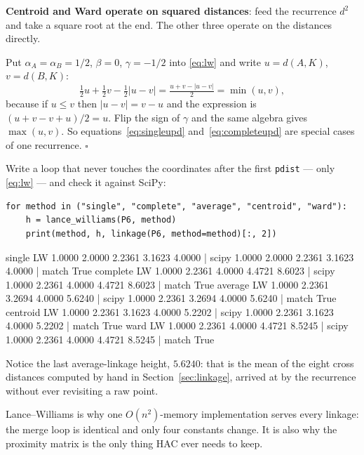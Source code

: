 \documentclass[11pt]{article}
\begin{document}
\textbf{Centroid and Ward operate on squared distances}: feed the recurrence
$d^2$ and take a square root at the end. The other three operate on the
distances directly.

\begin{worked}
Put $\alpha_A = \alpha_B = 1/2$, $\beta = 0$, $\gamma = -1/2$ into
\eqref{eq:lw} and write $u = d(A,K)$, $v = d(B,K)$:
\[
  \tfrac12 u + \tfrac12 v - \tfrac12|u-v| = \tfrac{u+v-|u-v|}{2} = \min(u,v),
\]
because if $u \le v$ then $|u-v| = v-u$ and the expression is
$(u+v-v+u)/2 = u$. Flip the sign of $\gamma$ and the same algebra gives
$\max(u,v)$. So equations~\eqref{eq:singleupd} and~\eqref{eq:completeupd} are
special cases of one recurrence. \ensuremath{\square}
\end{worked}

\begin{tryit}
Write a loop that never touches the coordinates after the first
\texttt{pdist} --- only \eqref{eq:lw} --- and check it against SciPy:
\begin{lstlisting}
for method in ("single", "complete", "average", "centroid", "ward"):
    h = lance_williams(P6, method)
    print(method, h, linkage(P6, method=method)[:, 2])
\end{lstlisting}
\begin{codeout}
  single    LW 1.0000 2.0000 2.2361 3.1623 4.0000 | scipy 1.0000 2.0000 2.2361 3.1623 4.0000 | match True
  complete  LW 1.0000 2.2361 4.0000 4.4721 8.6023 | scipy 1.0000 2.2361 4.0000 4.4721 8.6023 | match True
  average   LW 1.0000 2.2361 3.2694 4.0000 5.6240 | scipy 1.0000 2.2361 3.2694 4.0000 5.6240 | match True
  centroid  LW 1.0000 2.2361 3.1623 4.0000 5.2202 | scipy 1.0000 2.2361 3.1623 4.0000 5.2202 | match True
  ward      LW 1.0000 2.2361 4.0000 4.4721 8.5245 | scipy 1.0000 2.2361 4.0000 4.4721 8.5245 | match True
\end{codeout}
Notice the last average-linkage height, $5.6240$: that is the mean of the
eight cross distances computed by hand in Section~\ref{sec:linkage}, arrived
at by the recurrence without ever revisiting a raw point.
\end{tryit}

\begin{keyidea}
Lance--Williams is why one $O(n^2)$-memory implementation serves every
linkage: the merge loop is identical and only four constants change. It is
also why the proximity matrix is the only thing HAC ever needs to keep.
\end{keyidea}
\end{document}
